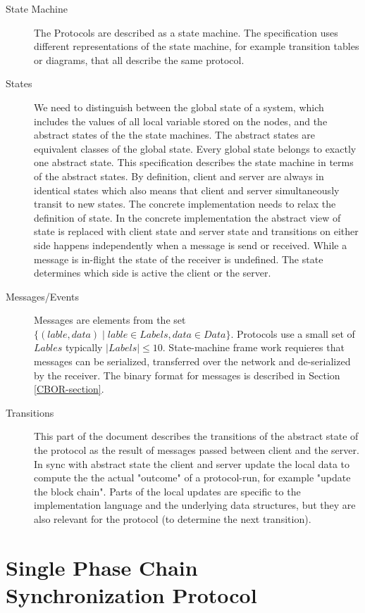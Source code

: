 \documentclass{report}
\theoremstyle{definition}{
  \newtheorem{lemma}{Lemma}[section] %
  \newtheorem{definition}[lemma]{Definition}
}
\theoremstyle{theorem}{
  \newtheorem{invariant}[lemma]{Invariant}
  \newtheorem{proofobligation}[lemma]{Proof Obligation}
}
\numberwithin{equation}{lemma}
\begin{document}
\begin{description}
\item[State Machine]
  The Protocols are described as a state machine.
  The specification uses different representations of the state machine,
  for example transition tables or diagrams, that all describe the same protocol.

\item[States]
  We need to distinguish between the global state of a system,
  which includes the values of all local variable stored on the nodes,
  and the abstract states of the the state machines.
  The abstract states are equivalent classes of the global state.
  Every global state belongs to exactly one abstract state.
  This specification describes the state machine in terms of the abstract states.
  By definition, client and server are always in identical states
  which also means that client and server simultaneously transit to new states.
  The concrete implementation needs to relax the definition of state.
  In the concrete implementation the abstract view of state is replaced with
  client state and server state and transitions on either side happens independently
  when a message is send or received.
  While a message is in-flight the state of the receiver is undefined.
  The state determines which side is active the client or the server.
  
\item[Messages/Events]
  Messages are elements from the set
  $\{(lable, data) \mid lable \in Labels, data \in Data\}$.
  Protocols use a small set of $Lables$ typically $|Labels| \leq 10$.
  State-machine frame work requieres that messages can be serialized,
  transferred over the network and de-serialized by the receiver.
  The binary format for messages is described in Section \ref{CBOR-section}.
\item[Transitions]
  This part of the document describes the transitions of the abstract state of the protocol
  as the result of messages passed between client and the server.
  In sync with abstract state the  client and server update the local data to compute the
  the actual "outcome" of a protocol-run, for example "update the block chain".
  Parts of the local updates are specific to the implementation language and the underlying
  data structures, but they are also relevant for the protocol (to determine the next transition).
\end{description}

\section{Single Phase Chain Synchronization Protocol}
\end{document}
